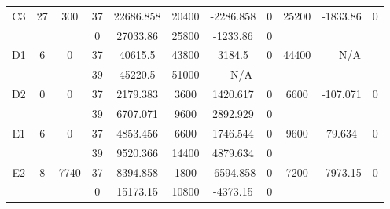 \begin{sidewaystable}
\begin{tabular}{c||c|c||c|c|c|c|c||c|c|c}
         &
        
      \\
      \hline
      \multirow{2}{*}{C3} &
      \multirow{2}{*}{27} &
      \multirow{2}{*}{300} &
      37 &
      22686.858 &
      20400 &
        -2286.858 &
        0 &
      \multirow{2}{*}{25200} &
        \multirow{2}{*}{-1833.86} &
        \multirow{2}{*}{0}
      \\
      \cline{4-8}
       &
       &
       &
      0 &
      27033.86 &
      25800 &
        -1233.86 &
        0 &
      
         &
        
      \\
      \hline
      \multirow{2}{*}{D1} &
      \multirow{2}{*}{6} &
      \multirow{2}{*}{0} &
      37 &
      40615.5 &
      43800 &
        3184.5 &
        0 &
      \multirow{2}{*}{44400} &
        \multicolumn{2}{c}{\multirow{2}{*}{N/A}}
      \\
      \cline{4-8}
       &
       &
       &
      39 &
      45220.5 &
      51000 &
        \multicolumn{2}{|c||}{N/A} &
      
        
      \\
      \hline
      \multirow{2}{*}{D2} &
      \multirow{2}{*}{0} &
      \multirow{2}{*}{0} &
      37 &
      2179.383 &
      3600 &
        1420.617 &
        0 &
      \multirow{2}{*}{6600} &
        \multirow{2}{*}{-107.071} &
        \multirow{2}{*}{0}
      \\
      \cline{4-8}
       &
       &
       &
      39 &
      6707.071 &
      9600 &
        2892.929 &
        0 &
      
         &
        
      \\
      \hline
      \multirow{2}{*}{E1} &
      \multirow{2}{*}{6} &
      \multirow{2}{*}{0} &
      37 &
      4853.456 &
      6600 &
        1746.544 &
        0 &
      \multirow{2}{*}{9600} &
        \multirow{2}{*}{79.634} &
        \multirow{2}{*}{0}
      \\
      \cline{4-8}
       &
       &
       &
      39 &
      9520.366 &
      14400 &
        4879.634 &
        0 &
      
         &
        
      \\
      \hline
      \multirow{2}{*}{E2} &
      \multirow{2}{*}{8} &
      \multirow{2}{*}{7740} &
      37 &
      8394.858 &
      1800 &
        -6594.858 &
        0 &
      \multirow{2}{*}{7200} &
        \multirow{2}{*}{-7973.15} &
        \multirow{2}{*}{0}
      \\
      \cline{4-8}
       &
       &
       &
      0 &
      15173.15 &
      10800 &
        -4373.15 &
        0 &
      

\end{tabular}
\end{sidewaystable}
